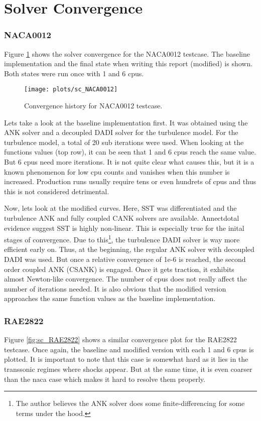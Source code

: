 \section{Solver Convergence}
\subsubsection{NACA0012}
Figure \ref{fig:sc_NACA0012} shows the solver convergence for the NACA0012
testcase. The baseline implementation and the final state when writing this
report (modified) is shown. Both states were run once with 1 and 6 cpus.

\begin{figure}[H] \centering
    \texttt{[image: plots/sc\_NACA0012]}
    \caption{Convergence history for NACA0012 testcase.}
    \label{fig:sc_NACA0012}
\end{figure}

\noindent Lets take a look at the baseline implementation first. It was
obtained using the ANK solver and a decoupled DADI solver for the turbulence
model. For the turbulence model, a total of 20 sub iterations were used. When
looking at the functions values (top row), it can be seen that 1 and 6 cpus
reach the same value. But 6 cpus need more iterations. It is not quite clear
what causes this, but it is a known phenomenon for low cpu counts and vanishes
when this number is increased. Production runs usually require tens or even
hundrets of cpus and thus this is not considered detrimental.


Now, lets look at the modified curves. Here, SST was differentiated and the
turbulence ANK and fully coupled CANK solvers are available. Annectdotal
evidence suggest SST is highly non-linear. This is especially true for the
inital stages of convergence. Due to this\footnote{The author believes the ANK
solver does some finite-differencing for some terms under the hood.}, the
turbulence DADI solver is way more efficient early on. Thus, at the beginning,
the regular ANK solver with decoupled DADI was used. But once a relative
convergence of 1e-6 is reached, the second order coupled ANK (CSANK) is
engaged. Once it gets traction, it exhibits almost Newton-like convergence. The
number of cpus does not really affect the number of iterations needed. It is
also obvious that the modified version approaches the same function values as
the baseline implementation. 




\subsubsection{RAE2822}
Figure \ref{fig:sc_RAE2822} shows a similar convergence plot for the RAE2822
testcase. Once again, the baseline and modified version with each 1 and 6 cpus
is plotted. It is important to note that this case is somewhat hard as it lies
in the transsonic regimes where shocks appear. But at the same time, it is even
coarser than the naca case which makes it hard to resolve them properly.

